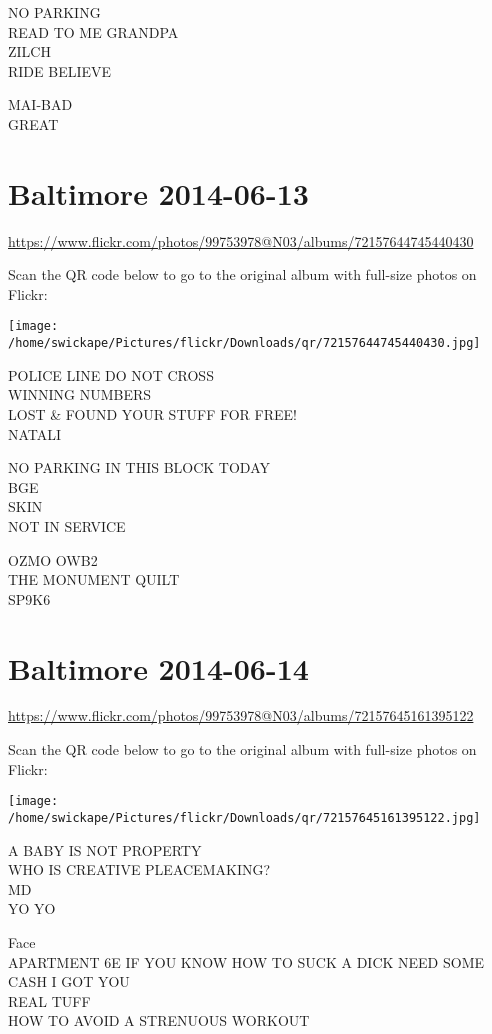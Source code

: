 \documentclass[10pt,letterpaper]{article}
\begin{document}
NO PARKING\\
READ TO ME GRANDPA\\
ZILCH\\
RIDE BELIEVE

MAI{-}BAD\\
GREAT


\section*{Baltimore 2014-06-13}

\url{https://www.flickr.com/photos/99753978@N03/albums/72157644745440430}

Scan the QR code below to go to the original album with full-size photos on Flickr:

\texttt{[image: /home/swickape/Pictures/flickr/Downloads/qr/72157644745440430.jpg]}


POLICE LINE DO NOT CROSS\\
WINNING NUMBERS\\
LOST \& FOUND YOUR STUFF FOR FREE!\\
NATALI

NO PARKING IN THIS BLOCK TODAY\\
BGE\\
SKIN\\
NOT IN SERVICE

OZMO OWB2\\
THE MONUMENT QUILT\\
SP9K6


\section*{Baltimore 2014-06-14}

\url{https://www.flickr.com/photos/99753978@N03/albums/72157645161395122}

Scan the QR code below to go to the original album with full-size photos on Flickr:

\texttt{[image: /home/swickape/Pictures/flickr/Downloads/qr/72157645161395122.jpg]}


A BABY IS NOT PROPERTY\\
WHO IS CREATIVE PLEACEMAKING?\\
MD\\
YO YO

Face\\
APARTMENT 6E IF YOU KNOW HOW TO SUCK A DICK NEED SOME CASH I GOT YOU\\
REAL TUFF\\
HOW TO AVOID A STRENUOUS WORKOUT
\end{document}

